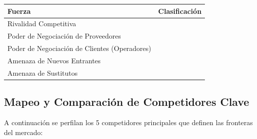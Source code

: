 \begin{porterbox}
\begin{tabular}{@{}ll@{}}
\textbf{Fuerza} & \textbf{Clasificación} \\
\midrule
Rivalidad Competitiva & \riskhigh{} \\
Poder de Negociación de Proveedores & \risklow{} \\
Poder de Negociación de Clientes (Operadores) & \riskhigh{} \\
Amenaza de Nuevos Entrantes & \riskmedium{} \\
Amenaza de Sustitutos & \riskmedium{} \\
\end{tabular}
\end{porterbox}

\subsection{Mapeo y Comparación de Competidores Clave}

A continuación se perfilan los 5 competidores principales que definen las fronteras del mercado:

